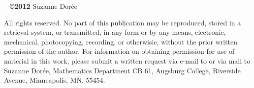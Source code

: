 \newpage

~\vfill 
\noindent \textbf{\copyright 2012} Suzanne Dor\'ee  

\noindent All rights reserved.  No part of this publication may be reproduced, stored in a retrieval system, or transmitted, in any form or by any means, electronic, mechanical, photocopying, recording, or otherwisie, without the prior written permission of the author.  For information on obtaining permission for use of material in this work, please submit a written request via e-mail to  or via mail to Suzanne Dor\'ee, Mathematics Department CB 61, Augsburg College, Riverside Avenue, Minneapolis, MN, 55454. 

\tableofcontents


\mainmatter

 
       
       
       
       
      
      
 
       
       
       
       
       
      
 
       
       
             
      
       
      
     
      
      
      
      
      
      
 
       
      
      
      
      
      
      
%

\backmatter












